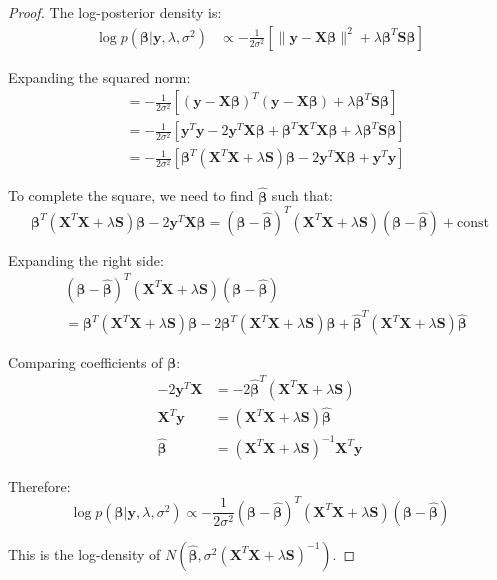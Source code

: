 \documentclass[12pt]{article}
\begin{document}
\begin{proof}
The log-posterior density is:
\begin{align}
\log p(\bm{\beta}|\mathbf{y}, \lambda, \sigma^2) &\propto -\frac{1}{2\sigma^2}\left[\|\mathbf{y} - \mathbf{X}\bm{\beta}\|^2 + \lambda\bm{\beta}^T\mathbf{S}\bm{\beta}\right]
\end{align}

Expanding the squared norm:
\begin{align}
&= -\frac{1}{2\sigma^2}\left[(\mathbf{y} - \mathbf{X}\bm{\beta})^T(\mathbf{y} - \mathbf{X}\bm{\beta}) + \lambda\bm{\beta}^T\mathbf{S}\bm{\beta}\right] \\
&= -\frac{1}{2\sigma^2}\left[\mathbf{y}^T\mathbf{y} - 2\mathbf{y}^T\mathbf{X}\bm{\beta} + \bm{\beta}^T\mathbf{X}^T\mathbf{X}\bm{\beta} + \lambda\bm{\beta}^T\mathbf{S}\bm{\beta}\right] \\
&= -\frac{1}{2\sigma^2}\left[\bm{\beta}^T(\mathbf{X}^T\mathbf{X} + \lambda\mathbf{S})\bm{\beta} - 2\mathbf{y}^T\mathbf{X}\bm{\beta} + \mathbf{y}^T\mathbf{y}\right]
\end{align}

To complete the square, we need to find $\hat{\bm{\beta}}$ such that:
\begin{equation}
\bm{\beta}^T(\mathbf{X}^T\mathbf{X} + \lambda\mathbf{S})\bm{\beta} - 2\mathbf{y}^T\mathbf{X}\bm{\beta} = (\bm{\beta} - \hat{\bm{\beta}})^T(\mathbf{X}^T\mathbf{X} + \lambda\mathbf{S})(\bm{\beta} - \hat{\bm{\beta}}) + \text{const}
\end{equation}

Expanding the right side:
\begin{align}
&(\bm{\beta} - \hat{\bm{\beta}})^T(\mathbf{X}^T\mathbf{X} + \lambda\mathbf{S})(\bm{\beta} - \hat{\bm{\beta}}) \\
&= \bm{\beta}^T(\mathbf{X}^T\mathbf{X} + \lambda\mathbf{S})\bm{\beta} - 2\bm{\beta}^T(\mathbf{X}^T\mathbf{X} + \lambda\mathbf{S})\hat{\bm{\beta}} + \hat{\bm{\beta}}^T(\mathbf{X}^T\mathbf{X} + \lambda\mathbf{S})\hat{\bm{\beta}}
\end{align}

Comparing coefficients of $\bm{\beta}$:
\begin{align}
-2\mathbf{y}^T\mathbf{X} &= -2\hat{\bm{\beta}}^T(\mathbf{X}^T\mathbf{X} + \lambda\mathbf{S}) \\
\mathbf{X}^T\mathbf{y} &= (\mathbf{X}^T\mathbf{X} + \lambda\mathbf{S})\hat{\bm{\beta}} \\
\hat{\bm{\beta}} &= (\mathbf{X}^T\mathbf{X} + \lambda\mathbf{S})^{-1}\mathbf{X}^T\mathbf{y}
\end{align}

Therefore:
\begin{equation}
\log p(\bm{\beta}|\mathbf{y}, \lambda, \sigma^2) \propto -\frac{1}{2\sigma^2}(\bm{\beta} - \hat{\bm{\beta}})^T(\mathbf{X}^T\mathbf{X} + \lambda\mathbf{S})(\bm{\beta} - \hat{\bm{\beta}})
\end{equation}

This is the log-density of $N(\hat{\bm{\beta}}, \sigma^2(\mathbf{X}^T\mathbf{X} + \lambda\mathbf{S})^{-1})$.
\end{proof}
\end{document}
